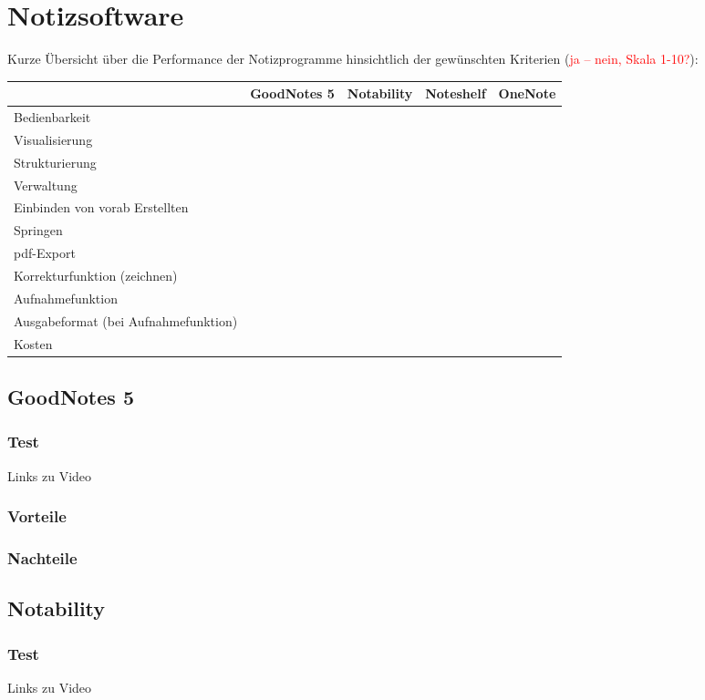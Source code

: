 \documentclass[parskip=off,index=totocnumbered]{scrreprt}
\begin{document}
\chapter{Notizsoftware}
Kurze Übersicht über die Performance der Notizprogramme hinsichtlich der gewünschten Kriterien (\textcolor{red}{ja -- nein, Skala 1-10?}):
\renewcommand*{\arraystretch}{2} 
\begin{longtable}{>{\centering \arraybackslash}p{3.2cm}>{\centering \arraybackslash}p{2.2cm}>{\centering \arraybackslash}p{2.2cm}>{\centering \arraybackslash}p{2.2cm}>{\centering \arraybackslash}p{2.2cm}} \toprule
& GoodNotes 5 & Notability & Noteshelf & OneNote \\ \midrule
Bedienbarkeit & & & & \\
Visualisierung & & & & \\
Strukturierung & & & & \\
Verwaltung & & & & \\
Einbinden von vorab Erstellten & & & & \\
Springen & & & & \\
pdf-Export & & & & \\
Korrekturfunktion (zeichnen) & & & & \\
Aufnahmefunktion & & & & \\ 
Ausgabeformat (bei Aufnahmefunktion) & & & & \\
Kosten & & & & \\ \bottomrule
\end{longtable}

\section{GoodNotes 5}
\subsection{Test}
Links zu Video
\subsection{Vorteile}
\subsection{Nachteile}

\section{Notability}
\subsection{Test}
Links zu Video
\end{document}

